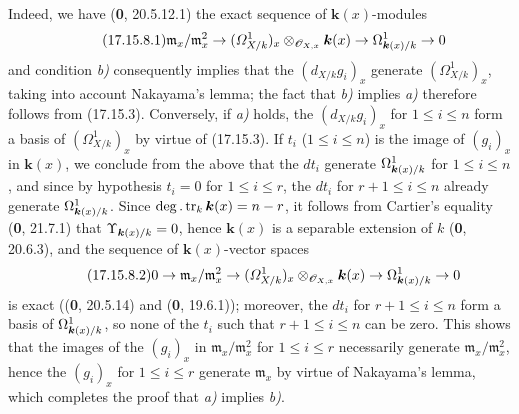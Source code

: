 Indeed, we have (\textbf{0}, 20.5.12.1) the exact sequence of $\boldsymbol{k}(x)$-modules
\[
\label{IV.17.15.8.1}
\tag{17.15.8.1}
\mathfrak m_x/\mathfrak m_x^2\to(\varOmega^1_{X/k})_x\otimes_{\mathscr{O}_{X,x}}\boldsymbol{k}(x)\to\Omega^1_{\boldsymbol{k}(x)/k}\to0
\]
and condition \emph{b)} consequently implies that the $(d_{X/k}g_i)_x$ generate $(\varOmega^1_{X/k})_x$, taking into account Nakayama's lemma; the fact that \emph{b)} implies \emph{a)} therefore follows from (17.15.3). Conversely, if \emph{a)} holds, the $(d_{X/k}g_i)_x$ for $1\leq i\leq n$ form a basis of $(\varOmega^1_{X/k})_x$ by virtue of (17.15.3). If $t_i$ ($1\leq i\leq n$) is the image of $(g_i)_x$ in $\boldsymbol{k}(x)$, we conclude from the above that the $dt_i$ generate $\Omega^1_{\boldsymbol{k}(x)/k}$ for $1\leq i\leq n$, and since by hypothesis $t_i=0$ for $1\leq i\leq r$, the $dt_i$ for $r+1\leq i\leq n$ already generate $\Omega^1_{\boldsymbol{k}(x)/k}$. Since $\deg.\operatorname{tr}_k \boldsymbol{k}(x)=n- r$, it follows from Cartier's equality (\textbf{0}, 21.7.1) that $\Upsilon_{\boldsymbol{k}(x)/k}=0$, hence $\boldsymbol{k}(x)$ is a separable extension of $k$ (\textbf{0}, 20.6.3), and the sequence of $\boldsymbol{k}(x)$-vector spaces
\[
\label{IV.17.15.8.2}
\tag{17.15.8.2}
0\to\mathfrak m_x/\mathfrak m_x^2\to(\varOmega^1_{X/k})_x\otimes_{\mathscr{O}_{X,x}}\boldsymbol{k}(x)\to\Omega^1_{\boldsymbol{k}(x)/k}\to0
\]
is exact ((\textbf{0}, 20.5.14) and (\textbf{0}, 19.6.1)); moreover, the $dt_i$ for $r+1\leq i\leq n$ form a basis of $\Omega^1_{\boldsymbol{k}(x)/k}$, so none of the $t_i$ such that $r+1\leq i\leq n$ can be zero. This shows that the images of the $(g_i)_x$ in $\mathfrak m_x/\mathfrak m_x^2$ for $1\leq i\leq r$ necessarily generate $\mathfrak m_x/\mathfrak m_x^2$, hence the $(g_i)_x$ for $1\leq i\leq r$ generate $\mathfrak m_x$ by virtue of Nakayama's lemma, which completes the proof that \emph{a)} implies \emph{b)}.

